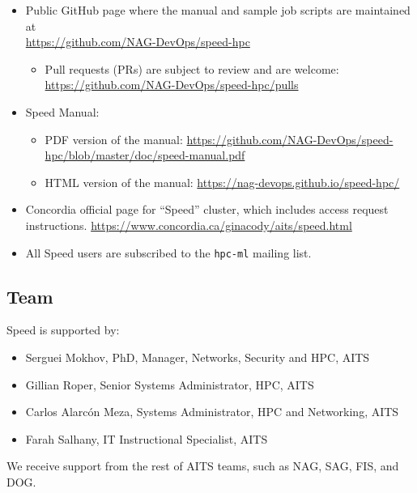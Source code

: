 \begin{itemize}
	\item
	Public GitHub page where the manual and sample job scripts are maintained at\\
	\url{https://github.com/NAG-DevOps/speed-hpc}
		\begin{itemize}
			\item Pull requests (PRs) are subject to review and are welcome:\\
			\url{https://github.com/NAG-DevOps/speed-hpc/pulls}
		\end{itemize}

	\item
	Speed Manual:
		\begin{itemize}
			\item PDF version of the manual:
			\url{https://github.com/NAG-DevOps/speed-hpc/blob/master/doc/speed-manual.pdf}
			\item HTML version of the manual:
			\url{https://nag-devops.github.io/speed-hpc/}
		\end{itemize}

	\item
	Concordia official page for ``Speed'' cluster, which includes access request instructions.
	\url{https://www.concordia.ca/ginacody/aits/speed.html}

	\item
	All Speed users are subscribed to the \texttt{hpc-ml} mailing list.
\end{itemize}

\subsection{Team}
\label{sect:speed-team}

Speed is supported by:
\begin{itemize}
	\item
	Serguei Mokhov, PhD, Manager, Networks, Security and HPC, AITS
	\item
	Gillian Roper, Senior Systems Administrator, HPC, AITS
	\item
	Carlos Alarcón Meza, Systems Administrator, HPC and Networking, AITS
	\item
	Farah Salhany, IT Instructional Specialist, AITS
\end{itemize}

We receive support from the rest of AITS teams, such as NAG, SAG, FIS, and DOG.

